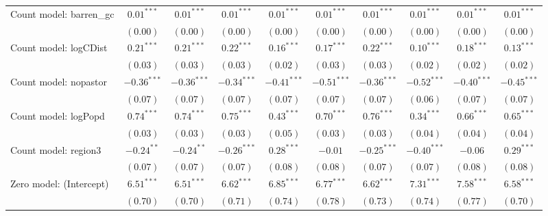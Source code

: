 \begin{center}
\begin{longtable}{l c c c c c c c c c}
Count model: barren\_gc        & $0.01^{***}$   & $0.01^{***}$   & $0.01^{***}$   & $0.01^{***}$    & $0.01^{***}$   & $0.01^{***}$    & $0.01^{***}$    & $0.01^{***}$    & $0.01^{***}$   \\
                               & $(0.00)$       & $(0.00)$       & $(0.00)$       & $(0.00)$        & $(0.00)$       & $(0.00)$        & $(0.00)$        & $(0.00)$        & $(0.00)$       \\
Count model: logCDist          & $0.21^{***}$   & $0.21^{***}$   & $0.22^{***}$   & $0.16^{***}$    & $0.17^{***}$   & $0.22^{***}$    & $0.10^{***}$    & $0.18^{***}$    & $0.13^{***}$   \\
                               & $(0.03)$       & $(0.03)$       & $(0.03)$       & $(0.02)$        & $(0.03)$       & $(0.03)$        & $(0.02)$        & $(0.02)$        & $(0.02)$       \\
Count model: nopastor          & $-0.36^{***}$  & $-0.36^{***}$  & $-0.34^{***}$  & $-0.41^{***}$   & $-0.51^{***}$  & $-0.36^{***}$   & $-0.52^{***}$   & $-0.40^{***}$   & $-0.45^{***}$  \\
                               & $(0.07)$       & $(0.07)$       & $(0.07)$       & $(0.07)$        & $(0.07)$       & $(0.07)$        & $(0.06)$        & $(0.07)$        & $(0.07)$       \\
Count model: logPopd           & $0.74^{***}$   & $0.74^{***}$   & $0.75^{***}$   & $0.43^{***}$    & $0.70^{***}$   & $0.76^{***}$    & $0.34^{***}$    & $0.66^{***}$    & $0.65^{***}$   \\
                               & $(0.03)$       & $(0.03)$       & $(0.03)$       & $(0.05)$        & $(0.03)$       & $(0.03)$        & $(0.04)$        & $(0.04)$        & $(0.04)$       \\
Count model: region3           & $-0.24^{**}$   & $-0.24^{**}$   & $-0.26^{***}$  & $0.28^{***}$    & $-0.01$        & $-0.25^{***}$   & $-0.40^{***}$   & $-0.06$         & $0.29^{***}$   \\
                               & $(0.07)$       & $(0.07)$       & $(0.07)$       & $(0.08)$        & $(0.08)$       & $(0.07)$        & $(0.07)$        & $(0.08)$        & $(0.08)$       \\
Zero model: (Intercept)        & $6.51^{***}$   & $6.51^{***}$   & $6.62^{***}$   & $6.85^{***}$    & $6.77^{***}$   & $6.62^{***}$    & $7.31^{***}$    & $7.58^{***}$    & $6.58^{***}$   \\
                               & $(0.70)$       & $(0.70)$       & $(0.71)$       & $(0.74)$        & $(0.78)$       & $(0.73)$        & $(0.74)$        & $(0.77)$        & $(0.70)$       \\

\end{longtable}
\end{center}
